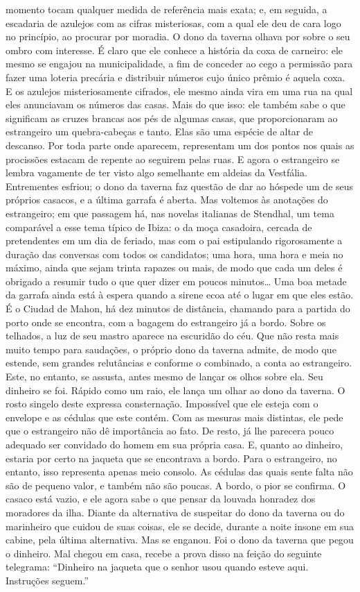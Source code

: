 momento tocam qualquer medida de referência mais exata; e, em seguida, a
escadaria de azulejos com as cifras misteriosas, com a qual ele deu de
cara logo no princípio, ao procurar por moradia. O dono da taverna
olhava por sobre o seu ombro com interesse. É claro que ele conhece a
história da coxa de carneiro: ele mesmo se engajou na municipalidade, a
fim de conceder ao cego a permissão para fazer uma loteria precária e
distribuir números cujo único prêmio é aquela coxa. E os azulejos
misteriosamente cifrados, ele mesmo ainda vira em uma rua na qual eles
anunciavam os números das casas. Mais do que isso: ele também sabe o que
significam as cruzes brancas aos pés de algumas casas, que
proporcionaram ao estrangeiro um quebra-cabeças e tanto. Elas são uma
espécie de altar de descanso. Por toda parte onde aparecem, representam
um dos pontos nos quais as procissões estacam de repente ao seguirem
pelas ruas. E agora o estrangeiro se lembra vagamente de ter visto algo
semelhante em aldeias da Vestfália. Entrementes esfriou; o dono da
taverna faz questão de dar ao hóspede um de seus próprios casacos, e a
última garrafa é aberta. Mas voltemos às anotações do estrangeiro; em
que passagem há, nas novelas italianas de Stendhal, um tema comparável a
esse tema típico de Ibiza: o da moça casadoira, cercada de pretendentes
em um dia de feriado, mas com o pai estipulando rigorosamente a duração
das conversas com todos os candidatos; uma hora, uma hora e meia no
máximo, ainda que sejam trinta rapazes ou mais, de modo que cada um
deles é obrigado a resumir tudo o que quer dizer em poucos minutos\ldots{}
Uma boa metade da garrafa ainda está à espera quando a sirene ecoa até o
lugar em que eles estão. É o Ciudad de Mahon, há dez minutos de
distância, chamando para a partida do porto onde se encontra, com a
bagagem do estrangeiro já a bordo. Sobre os telhados, a luz de seu
mastro aparece na escuridão do céu. Que não resta mais muito tempo para
saudações, o próprio dono da taverna admite, de modo que estende, sem
grandes relutâncias e conforme o combinado, a conta ao estrangeiro.
Este, no entanto, se assusta, antes mesmo de lançar os olhos sobre ela.
Seu dinheiro se foi. Rápido como um raio, ele lança um olhar ao dono da
taverna. O rosto singelo deste expressa consternação. Impossível que ele
esteja com o envelope e as cédulas que este contém. Com as mesuras mais
distintas, ele pede que o estrangeiro não dê importância ao fato. De
resto, já lhe parecera pouco adequado ser convidado do homem em sua
própria casa. E, quanto ao dinheiro, estaria por certo na jaqueta que se
encontrava a bordo. Para o estrangeiro, no entanto, isso representa
apenas meio consolo. As cédulas das quais sente falta não são de pequeno
valor, e também não são poucas. A bordo, o pior se confirma. O casaco
está vazio, e ele agora sabe o que pensar da louvada honradez dos
moradores da ilha. Diante da alternativa de suspeitar do dono da taverna
ou do marinheiro que cuidou de suas coisas, ele se decide, durante a
noite insone em sua cabine, pela última alternativa. Mas se enganou. Foi
o dono da taverna que pegou o dinheiro. Mal chegou em casa, recebe a
prova disso na feição do seguinte telegrama: ``Dinheiro na jaqueta que o
senhor usou quando esteve aqui. Instruções seguem.''

